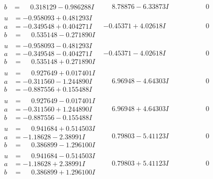 \documentclass[1p]{elsarticle_modified}
\theoremstyle{definition}
\begin{document}
$$\begin{array}{c|c|c}
\begin{aligned}
b &= \phantom{-}0.318129 - 0.986288 I\end{aligned}
 & \phantom{-}8.78876 - 6.33873 I & \phantom{-0.000000 } 0 \\ \hline\begin{aligned}
u &= -0.958093 + 0.481293 I \\
a &= -0.349548 + 0.404271 I \\
b &= \phantom{-}0.535148 - 0.271890 I\end{aligned}
 & -0.45371 + 4.02618 I & \phantom{-0.000000 } 0 \\ \hline\begin{aligned}
u &= -0.958093 - 0.481293 I \\
a &= -0.349548 - 0.404271 I \\
b &= \phantom{-}0.535148 + 0.271890 I\end{aligned}
 & -0.45371 - 4.02618 I & \phantom{-0.000000 } 0 \\ \hline\begin{aligned}
u &= \phantom{-}0.927649 + 0.017401 I \\
a &= -0.311560 - 1.244890 I \\
b &= -0.887556 + 0.155488 I\end{aligned}
 & \phantom{-}6.96948 - 4.64303 I & \phantom{-0.000000 } 0 \\ \hline\begin{aligned}
u &= \phantom{-}0.927649 - 0.017401 I \\
a &= -0.311560 + 1.244890 I \\
b &= -0.887556 - 0.155488 I\end{aligned}
 & \phantom{-}6.96948 + 4.64303 I & \phantom{-0.000000 } 0 \\ \hline\begin{aligned}
u &= \phantom{-}0.941684 + 0.514503 I \\
a &= -1.18628 - 2.38991 I \\
b &= \phantom{-}0.386899 - 1.296100 I\end{aligned}
 & \phantom{-}0.79803 - 5.41123 I & \phantom{-0.000000 } 0 \\ \hline\begin{aligned}
u &= \phantom{-}0.941684 - 0.514503 I \\
a &= -1.18628 + 2.38991 I \\
b &= \phantom{-}0.386899 + 1.296100 I\end{aligned}
 & \phantom{-}0.79803 + 5.41123 I & \phantom{-0.000000 } 0 \\ \hline\begin{aligned}

\end{aligned}
\end{array}$$
\end{document}
